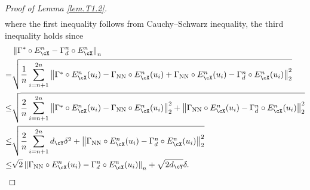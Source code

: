 \documentclass[11pt]{article} %
\begin{document}
\begin{proof}[Proof of Lemma \ref{lem.T1.2}]
\begin{align}
		\label{eq.T1.2}
	\end{align}
	where the first inequality follows from Cauchy--Schwarz inequality, the third inequality holds since
	\begin{align}
		&\left\|\Gamma^* \circ E_{\cX}^n-\Gamma_{d}^n \circ E_{\cX}^n\right\|_n \nonumber\\
		=& \sqrt{\frac{1}{n}\sum_{i=n+1}^{2n}\left\|\Gamma^* \circ E_{\cX}^n(u_i)-\Gamma_{\rm NN} \circ E_{\cX}^n(u_i)+\Gamma_{\rm NN} \circ E_{\cX}^n(u_i)-\Gamma_{d}^n \circ E_{\cX}^n(u_i)\right\|_2^2} \nonumber\\
		\leq &\sqrt{\frac{2}{n}\sum_{i=n+1}^{2n}\left\|\Gamma^* \circ E_{\cX}^n(u_i)-\Gamma_{\rm NN} \circ E_{\cX}^n(u_i)\right\|_2^2+\left\|\Gamma_{\rm NN} \circ E_{\cX}^n(u_i)-\Gamma_{d}^n \circ E_{\cX}^n(u_i)\right\|_2^2} \nonumber\\
		\leq &\sqrt{\frac{2}{n}\sum_{i=n+1}^{2n}d_{\cY}\delta^2+\left\|\Gamma_{\rm NN} \circ E_{\cX}^n(u_i)-\Gamma_{d}^n \circ E_{\cX}^n(u_i)\right\|_2^2} \nonumber\\
		\leq &\sqrt{2}\left\|\Gamma_{\rm NN} \circ E_{\cX}^n(u_i)-\Gamma_{d}^n \circ E_{\cX}^n(u_i)\right\|_n +\sqrt{2d_{\cY}}\delta.
	\end{align}
	

\end{proof}
\end{document}
